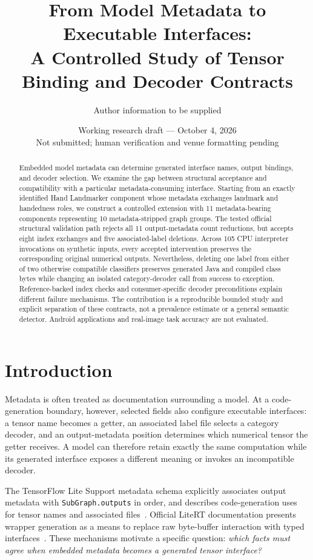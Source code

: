 \documentclass[10pt,twocolumn,letterpaper]{article}
\title{From Model Metadata to Executable Interfaces:\\A Controlled Study of Tensor Binding and Decoder Contracts}
\author{Author information to be supplied}
\date{Working research draft --- October 4, 2026\\\small Not submitted; human verification and venue formatting pending}
\newcommand{\code}[1]{\texttt{#1}}
\begin{document}
\maketitle
\begin{abstract}
Embedded model metadata can determine generated interface names, output bindings, and decoder selection. We examine the gap between structural acceptance and compatibility with a particular metadata-consuming interface. Starting from an exactly identified Hand Landmarker component whose metadata exchanges landmark and handedness roles, we construct a controlled extension with 11 metadata-bearing components representing 10 metadata-stripped graph groups. The tested official structural validation path rejects all 11 output-metadata count reductions, but accepts eight index exchanges and five associated-label deletions. Across 105 CPU interpreter invocations on synthetic inputs, every accepted intervention preserves the corresponding original numerical outputs. Nevertheless, deleting one label from either of two otherwise compatible classifiers preserves generated Java and compiled class bytes while changing an isolated category-decoder call from success to exception. Reference-backed index checks and consumer-specific decoder preconditions explain different failure mechanisms. The contribution is a reproducible bounded study and explicit separation of these contracts, not a prevalence estimate or a general semantic detector. Android applications and real-image task accuracy are not evaluated.
\end{abstract}

\section{Introduction}
Metadata is often treated as documentation surrounding a model. At a code-generation boundary, however, selected fields also configure executable interfaces: a tensor name becomes a getter, an associated label file selects a category decoder, and an output-metadata position determines which numerical tensor the getter receives. A model can therefore retain exactly the same computation while its generated interface exposes a different meaning or invokes an incompatible decoder.

The TensorFlow Lite Support metadata schema explicitly associates output metadata with \code{SubGraph.outputs} in order, and describes code-generation uses for tensor names and associated files~\cite{schema}. Official LiteRT documentation presents wrapper generation as a means to replace raw byte-buffer interaction with typed interfaces~\cite{codegen-doc}. These mechanisms motivate a specific question: \emph{which facts must agree when embedded metadata becomes a generated tensor interface?}
\end{document}
